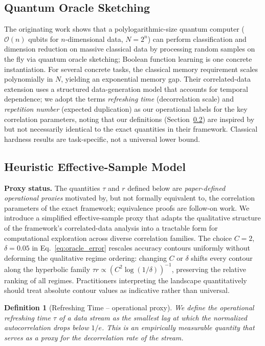 \documentclass[preprint,12pt,authoryear]{elsarticle}
\newtheorem{definition}{Definition}
\newcommand{\bigO}{\mathcal{O}}
\begin{document}
\subsection{Quantum Oracle Sketching}

The originating work \citep{zhao2026exponential} shows that a polylogarithmic-size quantum computer ($\bigO(n)$ qubits for $n$-dimensional data, $N = 2^n$) can perform classification and dimension reduction on massive classical data by processing random samples on the fly via quantum oracle sketching; Boolean function learning is one concrete instantiation. For several concrete tasks, the classical memory requirement scales polynomially in $N$, yielding an exponential memory gap. Their correlated-data extension uses a structured data-generation model that accounts for temporal dependence; we adopt the terms \emph{refreshing time} (decorrelation scale) and \emph{repetition number} (expected duplication) as our operational labels for the key correlation parameters, noting that our definitions (Section~\ref{sec:heuristic_model}) are inspired by but not necessarily identical to the exact quantities in their framework. Classical hardness results are task-specific, not a universal lower bound.

\subsection{Heuristic Effective-Sample Model}
\label{sec:heuristic_model}

\textbf{Proxy status.} The quantities $\tau$ and $r$ defined below are \emph{paper-defined operational proxies} motivated by, but not formally equivalent to, the correlation parameters of the exact framework; equivalence proofs are follow-on work. We introduce a simplified effective-sample proxy that adapts the qualitative structure of the framework's correlated-data analysis into a tractable form for computational exploration across diverse correlation families. The choice $C{=}2$, $\delta{=}0.05$ in Eq.~\eqref{eq:oracle_error} rescales accuracy contours uniformly without deforming the qualitative regime ordering: changing $C$ or $\delta$ shifts every contour along the hyperbolic family $\tau r \propto (C^2 \log(1/\delta))^{-1}$, preserving the relative ranking of all regimes. Practitioners interpreting the landscape quantitatively should treat absolute contour values as indicative rather than universal.

\begin{definition}[Refreshing Time -- operational proxy]
We define the \emph{operational refreshing time} $\tau$ of a data stream as the smallest lag at which the normalized autocorrelation drops below $1/e$. This is an empirically measurable quantity that serves as a proxy for the decorrelation rate of the stream.
\end{definition}
\end{document}
